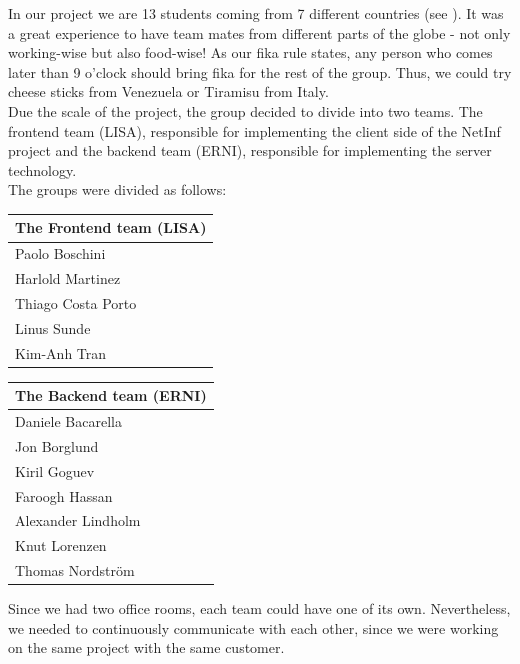 In our project we are 13 students coming from 7 different countries (see ).
It was a great experience to have team mates from different parts of the globe - not
only working-wise but also food-wise! As our fika rule states, any person who comes later
than 9 o'clock should bring fika for the rest of the group. Thus, we could
try cheese sticks from Venezuela or Tiramisu from Italy.\\

Due the scale of the project, the group decided to divide into two teams. 
The frontend team (LISA), responsible for implementing the client side of the NetInf project and the backend team (ERNI), responsible for implementing the server technology.\\

The groups were divided as follows:

\begin{minipage}[b]{0.32\hsize}\centering
\begin{tabular}{l}
The Frontend team (LISA) \\\hline
Paolo Boschini\\
Harlold Martinez\\
Thiago Costa Porto\\
Linus Sunde\\
Kim-Anh Tran
\end{tabular}
\end{minipage}
\hfill
\begin{minipage}[b]{0.32\hsize}\centering
\begin{tabular}{l}
The Backend team (ERNI) \\\hline
Daniele Bacarella\\
Jon Borglund\\
Kiril Goguev\\
Faroogh Hassan\\
Alexander Lindholm\\
Knut Lorenzen\\
Thomas Nordstr\"om
\end{tabular}
\end{minipage}

Since we had two office rooms, each team could have one of its own.
Nevertheless, we needed to continuously communicate with each other,
since we were working on the same project with the same customer.

